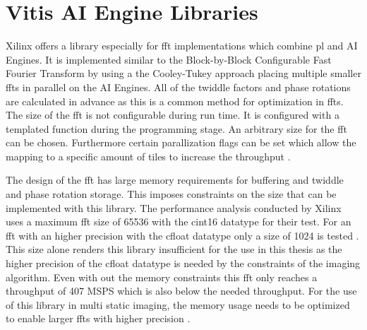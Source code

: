 \section{Vitis AI Engine Libraries }
Xilinx offers a library especially for \ac{fft} implementations which combine \ac{pl} and AI Engines. It is implemented similar to the Block-by-Block Configurable Fast Fourier Transform by using a the Cooley-Tukey approach placing multiple smaller \ac{fft}s in parallel on the AI Engines. All of the twiddle factors and phase rotations are calculated in advance as this is a common method for optimization in \ac{fft}s. The size of the \ac{fft} is not configurable during run time. It is configured with a templated function during the programming stage. An arbitrary size for the \ac{fft} can be chosen. Furthermore certain parallization flags can be set which allow the mapping to a specific amount of tiles to increase the throughput \cite{vitis_libs}.\par
The design of the \ac{fft} has large memory requirements for buffering and twiddle and phase rotation storage. This imposes constraints on the size that can be implemented with this library. The performance analysis conducted by Xilinx uses a maximum \ac{fft} size of 65536 with the cint16 datatype for their test. For an \ac{fft} with an higher precision with the cfloat datatype only a size of 1024 is tested \cite{fft_libs}. This size alone renders this library insufficient for the use in this thesis as the higher precision of the cfloat datatype is needed by the constraints of the imaging algorithm. Even with out the memory constraints this \ac{fft} only reaches a throughput of 407 MSPS which is also below the needed throughput. For the use of this library in multi static imaging, the memory usage needs to be optimized to enable larger \ac{fft}s with higher precision \cite{fft_libs}. 